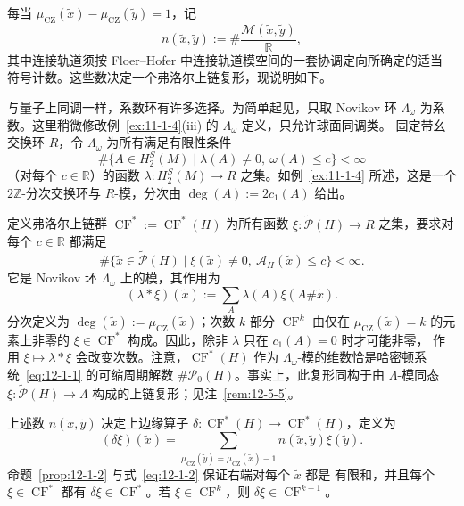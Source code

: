 每当 $\mu_{\mathrm{CZ}}(\widetilde x)-\mu_{\mathrm{CZ}}(\widetilde y)=1$，记
\[
  n(\widetilde x,\widetilde y):=
  \#\frac{\mathcal M(\widetilde x,\widetilde y)}{\mathbb R},
\]
其中连接轨道须按 Floer--Hofer  中连接轨道模空间的一套协调定向所确定的适当
符号计数。这些数决定一个弗洛尔上链复形，现说明如下。

与量子上同调一样，系数环有许多选择。为简单起见，只取 Novikov 环 $\Lambda_\omega$
为系数。这里稍微修改例~\ref{ex:11-1-4}(iii) 的 $\Lambda_\omega$ 定义，只允许球面同调类。
固定带幺交换环 $R$，令 $\Lambda_\omega$ 为所有满足有限性条件
\[
  \#\{A\in H_2^S(M)\mid \lambda(A)\neq0,\ \omega(A)\leq c\}<\infty
\]
（对每个 $c\in\mathbb R$）的函数 $\lambda:H_2^S(M)\to R$ 之集。如例~\ref{ex:11-1-4}
所述，这是一个 $2\mathbb Z$-分次交换环与 $R$-模，分次由 $\deg(A):=2c_1(A)$ 给出。

定义弗洛尔上链群 $\operatorname{CF}^*:=\operatorname{CF}^*(H)$ 为所有函数
$\xi:\widetilde{\mathcal P}(H)\to R$ 之集，要求对每个 $c\in\mathbb R$ 都满足
\begin{equation}\label{eq:12-1-8}
  \#\{\widetilde x\in\widetilde{\mathcal P}(H)
  \mid \xi(\widetilde x)\neq0,\ \mathcal A_H(\widetilde x)\leq c\}<\infty.
\end{equation}
它是 Novikov 环 $\Lambda_\omega$ 上的模，其作用为
\[
  (\lambda*\xi)(\widetilde x):=\sum_A\lambda(A)\xi(A\#\widetilde x).
\]
分次定义为 $\deg(\widetilde x):=\mu_{\mathrm{CZ}}(\widetilde x)$；次数 $k$ 部分
$\operatorname{CF}^k$ 由仅在 $\mu_{\mathrm{CZ}}(\widetilde x)=k$ 的元素上非零的
$\xi\in\operatorname{CF}^*$ 构成。因此，除非 $\lambda$ 只在 $c_1(A)=0$ 时才可能非零，
作用 $\xi\mapsto\lambda*\xi$ 会改变次数。注意，$\operatorname{CF}^*(H)$ 作为
$\Lambda_\omega$-模的维数恰是哈密顿系统~\eqref{eq:12-1-1} 的可缩周期解数
$\#\mathcal P_0(H)$。事实上，此复形同构于由 $\Lambda$-模同态
$\xi:\widetilde{\mathcal P}(H)\to\Lambda$ 构成的上链复形；见注~\ref{rem:12-5-5}。

上述数 $n(\widetilde x,\widetilde y)$ 决定上边缘算子
$\delta:\operatorname{CF}^*(H)\to\operatorname{CF}^*(H)$，定义为
\begin{equation}\label{eq:12-1-9}
  (\delta\xi)(\widetilde x)=
  \sum_{\mu_{\mathrm{CZ}}(\widetilde y)=\mu_{\mathrm{CZ}}(\widetilde x)-1}
  n(\widetilde x,\widetilde y)\xi(\widetilde y).
\end{equation}
命题~\ref{prop:12-1-2} 与式~\eqref{eq:12-1-2} 保证右端对每个 $\widetilde x$ 都是
有限和，并且每个 $\xi\in\operatorname{CF}^*$ 都有
$\delta\xi\in\operatorname{CF}^*$。若 $\xi\in\operatorname{CF}^k$，则
$\delta\xi\in\operatorname{CF}^{k+1}$。

